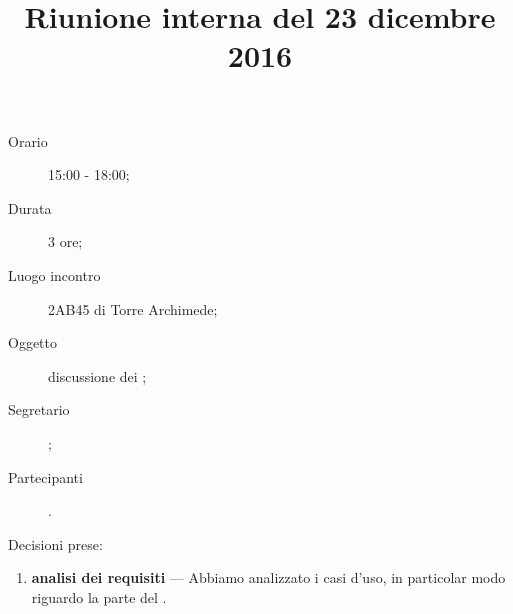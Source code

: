 


\author{\PB}
\supervisor{\MM}
\dest{\ALL}
\title{Riunione interna del 23 dicembre 2016}



\maketitle

\begin{description}
	\item[Orario] 15:00 - 18:00;
	\item[Durata] 3 ore;
	\item[Luogo incontro] 2AB45 di Torre Archimede;
	\item[Oggetto] discussione dei ;
	\item[Segretario] \PB;
	\item[Partecipanti] \ALL.
\end{description}

Decisioni prese:
\begin{enumerate}
	\item \textbf{analisi dei requisiti} --- Abbiamo analizzato i casi d'uso, in particolar modo riguardo la parte del .
\end{enumerate}


